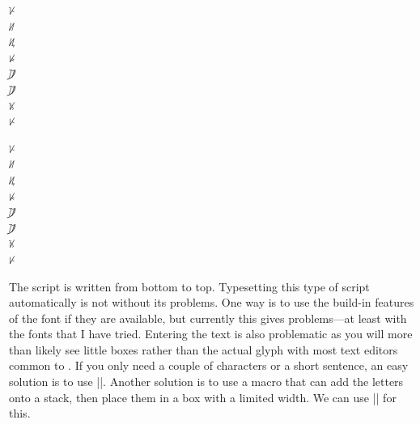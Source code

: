 \begin{minipage}[t]{2cm}
\begin{tcolorbox}[width=2cm,colback=graphicbackground,
boxrule=0pt,toprule=0pt,colframe=white]
\Large\hanunoo
ᜩ\\
ᜤ\\
ᜮ\\
ᜥᜳ\\
ᜨ᜴ \\
ᜨ᜴\\
ᜫᜳ\\
ᜥ\\
\end{tcolorbox}
\end{minipage}
\begin{minipage}[t]{2cm}
\begin{tcolorbox}[width=2cm,colback=graphicbackground,
boxrule=0pt,toprule=0pt,colframe=white]
\LARGE\hanunoo
ᜩ\\
ᜤ\\
ᜮ\\
ᜥᜳ\\
ᜨ᜴ \\
ᜨ᜴\\
ᜫᜳ\\
ᜥ\\
\end{tcolorbox}
\end{minipage}
\begin{minipage}[t]{\textwidth-6cm}

The script is written from bottom to top. Typesetting this type of script automatically is not without its problems. One way is to use the build-in features of the font if they are available, but currently this gives problems---at least with the fonts that I have tried. Entering the text is also problematic as you will more than likely see little boxes rather than the actual glyph with most text editors common to \latexe. If you only need a couple of characters or a short sentence, an easy solution is to use |\rotatebox|. Another solution is to use a macro that can add the letters onto a stack, then place them in a box with a limited width. We can use |\@tfor| for this.  
\end{minipage}